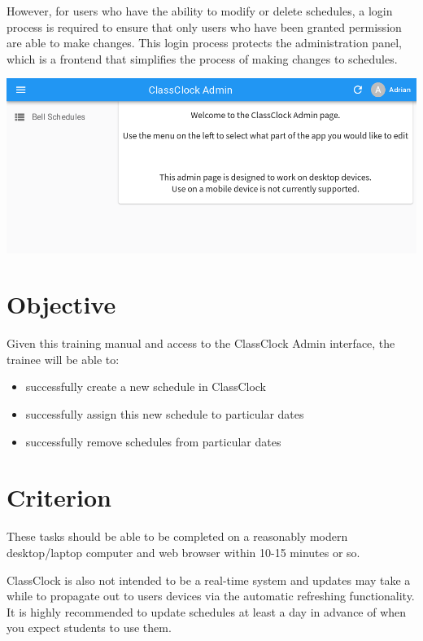 \documentclass{article}
\begin{document}
{However, for users who have the ability to modify or delete schedules, a login process is required to ensure that only
users who have been granted permission are able to make changes. This login process protects the administration panel,
which is a frontend that simplifies the process of making changes to schedules.}



\begin{center}
\includegraphics[width=\textwidth]{images/adminpage.png}
\end{center}


\section{Objective}
{Given this training manual and access to the ClassClock Admin interface, the trainee will be able to:}

\begin{itemize}
\item {successfully create a new schedule in ClassClock}
\item {successfully assign this new schedule to particular dates}
\item {successfully remove schedules from particular dates}
\end{itemize}


\section{Criterion}
{These tasks should be able to be completed on a reasonably modern desktop/laptop computer and web browser within 10-15
minutes or so.}

{ClassClock is also not intended to be a real-time system and updates may take a while to propagate out to users devices
via the automatic refreshing functionality. It is highly recommended to update schedules at least a day in advance of
when you expect students to use them.}
\end{document}
